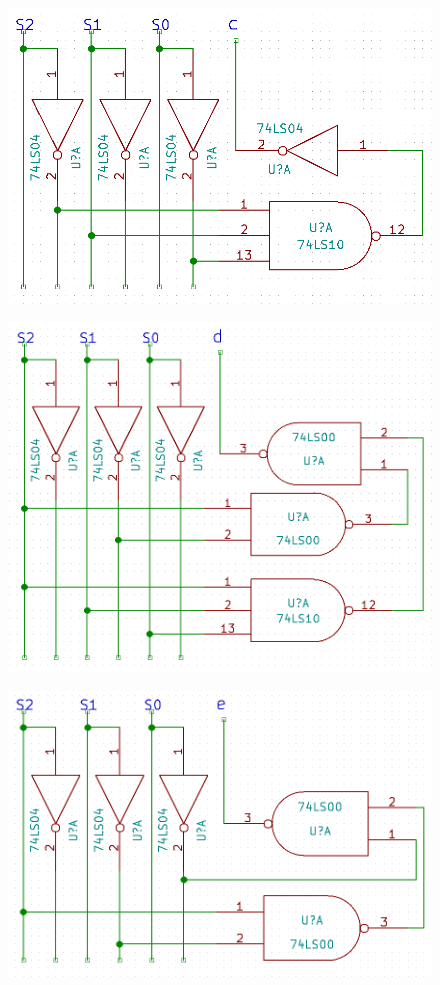\documentclass[11pt,a4paper]{article}
\begin{document}
\begin{figure}[H]
    \centering
    \includegraphics[width=6in]{c.png}
\end{figure}
\begin{figure}[H]
    \centering
    \includegraphics[width=6in]{d.png}
\end{figure}
\begin{figure}[H]
    \centering
    \includegraphics[width=6in]{e.png}
\end{figure}
\end{document}
